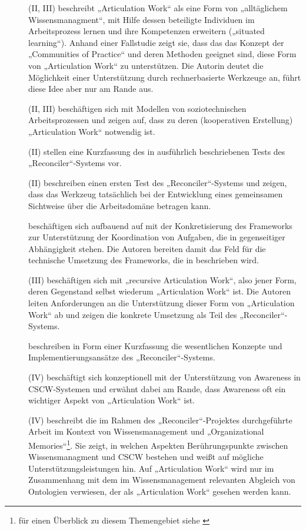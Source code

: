 \begin{description}
	\item[\citet{Davenport02}] (II, III) beschreibt „Articulation Work“ als eine Form von „alltäglichem Wissensmanagment“, mit Hilfe dessen beteiligte Individuen im Arbeitsprozess lernen und ihre Kompetenzen erweitern („situated learning“). Anhand einer Fallstudie zeigt sie, dass das das Konzept der „Communities of Practice“ \citep{Wenger98} und deren Methoden geeignet sind, diese Form von „Articulation Work“ zu unterstützen. Die Autorin deutet die Möglichkeit einer Unterstützung durch rechnerbasierte Werkzeuge an, führt diese Idee aber nur am Rande aus.
	\item[\citet{Herrmann02}] (II, III) beschäftigen sich mit Modellen von soziotechnischen Arbeitsprozessen und zeigen auf, dass zu deren (kooperativen Erstellung) „Articulation Work“ notwendig ist. 
	\item[\citet{Mark02}] (II) stellen eine Kurzfassung des in \citep{Mark02a} ausführlich beschriebenen Tests des „Reconciler“-Systems vor.
	\item[\citet{Mark02a}] (II) beschreiben einen ersten Test des „Reconciler“-Systems und zeigen, dass das Werkzeug tatsächlich bei der Entwicklung eines gemeinsamen Sichtweise über die Arbeitsdomäne betragen kann.
	\item[\citet{Raposo02}] beschäftigen sich aufbauend auf \citep{Raposo01} mit der Konkretisierung des Frameworks zur Unterstützung der Koordination von Aufgaben, die in gegenseitiger Abhängigkeit stehen. Die Autoren bereiten damit das Feld für die technische Umsetzung des Frameworks, die in \citep{Raposo04} beschrieben wird.
	\item[\citet{Sarini02}] (III) beschäftigen sich mit „recursive Articulation Work“, also jener Form, deren Gegenstand selbst wiederum „Articulation Work“ ist. Die Autoren leiten Anforderungen an die Unterstützung dieser Form von „Articulation Work“ ab und zeigen die konkrete Umsetzung als Teil des „Reconciler“-Systems.
	\item[\citet{Sarini02a}] beschreiben in Form einer Kurzfassung die wesentlichen Konzepte und Implementierungsansätze des „Reconciler“-Systems.
	\item[\citet{Schmidt02}] (IV) beschäftigt sich konzeptionell mit der Unterstützung von Awareness in \gls{CSCW}-Systemen und erwähnt dabei am Rande, dass Awareness oft ein wichtiger Aspekt von „Articulation Work“ ist.
	\item[\citet{Simone02}] (IV) beschreibt die im Rahmen des „Reconciler“-Projektes durchgeführte Arbeit im Kontext von Wissensmanagement und „Organizational Memories“\footnote{für einen Überblick zu diesem Themengebiet siehe \citep{Maier08}}. Sie zeigt, in welchen Aspekten Berührungspunkte zwischen Wissensmanagment und \gls{CSCW} bestehen und weißt auf mögliche Unterstützungsleistungen hin. Auf „Articulation Work“ wird nur im Zusammenhang mit dem im Wissensmanagement relevanten Abgleich von Ontologien verwiesen, der als „Articulation Work“ gesehen werden kann.

\end{description}
